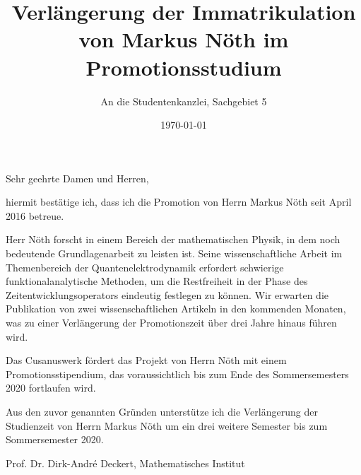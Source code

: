 \documentclass[11pt,a4paper]{article}
\begin{document}
\title{Verlängerung der Immatrikulation von Markus Nöth im Promotionsstudium }

\author{An die Studentenkanzlei, Sachgebiet 5}

\date{\today}
\maketitle


Sehr geehrte Damen und Herren,

hiermit bestätige ich, dass ich die Promotion von Herrn Markus Nöth seit April 2016 betreue.

Herr Nöth forscht in einem Bereich der mathematischen Physik, in dem noch bedeutende Grundlagenarbeit zu leisten ist. Seine wissenschaftliche Arbeit im Themenbereich der Quantenelektrodynamik erfordert schwierige funktionalanalytische Methoden, um die Restfreiheit in der Phase des Zeitentwicklungsoperators eindeutig festlegen zu können. Wir erwarten die Publikation von zwei wissenschaftlichen Artikeln in den kommenden Monaten, was zu einer Verlängerung der Promotionszeit über drei Jahre hinaus führen wird.

Das Cusanuswerk fördert das Projekt von Herrn Nöth mit einem Promotionsstipendium, das voraussichtlich bis zum Ende des Sommersemesters 2020 fortlaufen wird.

Aus den zuvor genannten Gründen unterstütze ich die Verlängerung der Studienzeit von Herrn Markus Nöth um ein drei weitere Semester bis zum Sommersemester 2020.

\vspace*{2cm}
Prof. Dr. Dirk-Andr\'e Deckert, Mathematisches Institut

\maketitle
\end{document}
